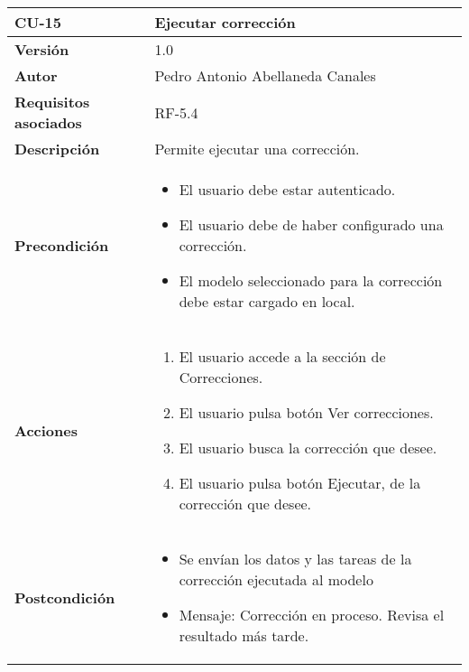 \begin{table}[p]
	\centering
	\begin{tabularx}{\linewidth}{ p{} p{} }
		\toprule
		\textbf{CU-15}    & \textbf{Ejecutar corrección} \\
		\midrule
		\textbf{Versión}              & 1.0    \\
		\textbf{Autor}                & Pedro Antonio Abellaneda Canales \\
		\textbf{Requisitos asociados} & RF-5.4 \\
		\textbf{Descripción}          & Permite ejecutar una corrección. \\
		\textbf{Precondición}         & \begin{itemize}
                                        \tightlist
		                                  \item El usuario debe estar autenticado.
		                                  \item El usuario debe de haber configurado una corrección.
		                                  \item El modelo seleccionado para la corrección debe estar cargado en local.
		                                 \end{itemize} \\
		\textbf{Acciones}             &
                            		\begin{enumerate}
                            			\def\labelenumi{\arabic{enumi}.}
                            			\tightlist
                            			\item El usuario accede a la sección de Correcciones.
                                        \item El usuario pulsa botón Ver correcciones.
                                        \item El usuario busca la corrección que desee.
                                        \item El usuario pulsa botón Ejecutar, de la corrección que desee.
                            		\end{enumerate} \\
		\textbf{Postcondición}        & \begin{itemize}
                                        \tightlist
		                                  \item Se envían los datos y las tareas de la corrección ejecutada al modelo
		                                  \item Mensaje: Corrección en proceso. Revisa el resultado más tarde.

\end{itemize}
\end{tabularx}
\end{table}
